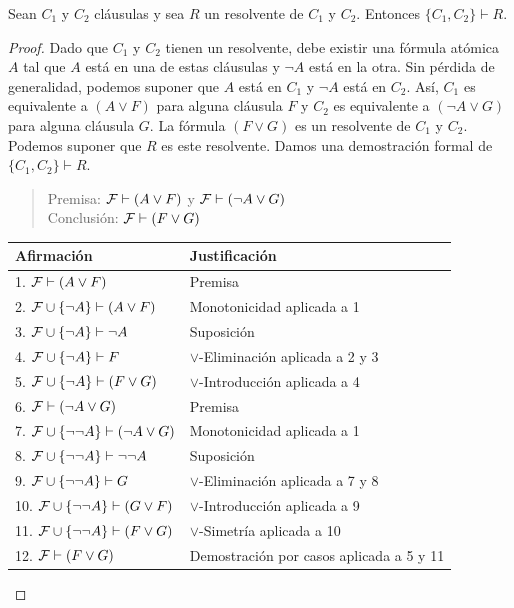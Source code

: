 \documentclass[12pt,a4paper]{book}
\makeatletter
\newenvironment{derivacion}{%
  \begingroup
  \renewcommand{\arraystretch}{1.35}
  \begin{center}
  \begin{tabular}{@{}l l@{}}
    \textbf{Afirmación} & \textbf{Justificación}\\
    \hline
}{%
  \end{tabular}
  \end{center}
  \endgroup
}
\makeatother
\begin{document}
    \begin{proposicion}\label{prop:resolvente-deducible}
        Sean $C_{1}$ y $C_{2}$ cláusulas y sea $R$ un resolvente de $C_{1}$ y $C_{2}$. Entonces $\{C_{1},C_{2}\}\vdash R$.
    \end{proposicion}
    \begin{proof}
        Dado que $C_{1}$ y $C_{2}$ tienen un resolvente, debe existir una fórmula atómica $A$ tal que $A$ está en una de
        estas cláusulas y $\neg A$ está en la otra. Sin pérdida de generalidad, podemos suponer que $A$ está en $C_{1}$ y
        $\neg A$ está en $C_{2}$. Así, $C_{1}$ es equivalente a $(A\vee F)$ para alguna cláusula $F$ y $C_{2}$ es equivalente
        a $(\neg A\vee G)$ para alguna cláusula $G$. La fórmula $(F\vee G)$ es un resolvente de $C_{1}$ y $C_{2}$. Podemos
        suponer que $R$ es este resolvente. Damos una demostración formal de $\{C_{1},C_{2}\}\vdash R$.

        \begin{quote}
            Premisa: $\mathcal{F}\vdash(A\vee F)$ y $\mathcal{F}\vdash(\neg A\vee G)$\\
            Conclusión: $\mathcal{F}\vdash(F\vee G)$
        \end{quote}

        \begin{derivacion}
            1. $\mathcal{F}\vdash(A\vee F)$ & Premisa\\
            2. $\mathcal{F}\cup\{\neg A\}\vdash(A\vee F)$ & Monotonicidad aplicada a 1\\
            3. $\mathcal{F}\cup\{\neg A\}\vdash\neg A$ & Suposición\\
            4. $\mathcal{F}\cup\{\neg A\}\vdash F$ & $\vee$-Eliminación aplicada a 2 y 3\\
            5. $\mathcal{F}\cup\{\neg A\}\vdash(F\vee G)$ & $\vee$-Introducción aplicada a 4\\
            6. $\mathcal{F}\vdash(\neg A\vee G)$ & Premisa\\
            7. $\mathcal{F}\cup\{\neg\neg A\}\vdash(\neg A\vee G)$ & Monotonicidad aplicada a 1\\
            8. $\mathcal{F}\cup\{\neg\neg A\}\vdash\neg\neg A$ & Suposición\\
            9. $\mathcal{F}\cup\{\neg\neg A\}\vdash G$ & $\vee$-Eliminación aplicada a 7 y 8\\
            10. $\mathcal{F}\cup\{\neg\neg A\}\vdash(G\vee F)$ & $\vee$-Introducción aplicada a 9\\
            11. $\mathcal{F}\cup\{\neg\neg A\}\vdash(F\vee G)$ & $\vee$-Simetría aplicada a 10\\
            12. $\mathcal{F}\vdash(F\vee G)$ & Demostración por casos aplicada a 5 y 11\\
        \end{derivacion}
    \end{proof}
\end{document}
